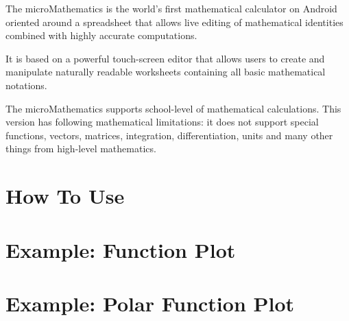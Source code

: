 \documentclass[DIV=calc, paper=a4, fontsize=11pt, twocolumn]{scrartcl}
\begin{document}
\maketitle
\thispagestyle{fancy} %

\begin{bf}
The microMathematics is the world's first mathematical
calculator on Android oriented around a spreadsheet that allows live editing of
mathematical identities combined with highly accurate computations.

It is based on a powerful touch-screen editor that allows users to create and
manipulate naturally readable worksheets containing all basic mathematical
notations.

The microMathematics supports school-level of mathematical calculations.
This version has following mathematical limitations: it does not support special
functions, vectors, matrices, integration, differentiation, units and many
other things from high-level mathematics.
\end{bf}

\section{How To Use}


\section{Example: Function Plot}


\section{Example: Polar Function Plot}

\end{document}
